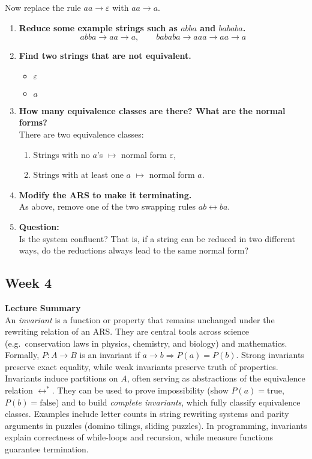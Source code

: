 \documentclass{article}
\theoremstyle{plain}
\theoremstyle{definition}
\theoremstyle{remark}
\begin{document}
Now replace the rule $aa \to \varepsilon$ with $aa \to a$.

\begin{enumerate}
  \item \textbf{Reduce some example strings such as $abba$ and $bababa$.}
  \[
    abba \to aa \to a, \qquad
    bababa \to aaa \to aa \to a
  \]

  \item \textbf{Find two strings that are not equivalent.}
  \begin{itemize}
    \item $\varepsilon$
    \item $a$
  \end{itemize}

  \item \textbf{How many equivalence classes are there? What are the normal forms?} \\
  There are two equivalence classes:
  \begin{enumerate}
    \item Strings with no $a$’s $\mapsto$ normal form $\varepsilon$,
    \item Strings with at least one $a$ $\mapsto$ normal form $a$.
  \end{enumerate}

  \item \textbf{Modify the ARS to make it terminating.} \\
  As above, remove one of the two swapping rules $ab \leftrightarrow ba$.

  \item \textbf{Question:} \\
  Is the system confluent? That is, if a string can be reduced in two different ways, do the reductions always lead to the same normal form?
\end{enumerate}

\subsection{Week 4}
\textbf{Lecture Summary}
\\An \emph{invariant} is a function or property that remains unchanged under the rewriting relation of an ARS. 
They are central tools across science (e.g.\ conservation laws in physics, chemistry, and biology) and mathematics. 
Formally, $P:A\to B$ is an invariant if $a\to b \Rightarrow P(a)=P(b)$. 
Strong invariants preserve exact equality, while weak invariants preserve truth of properties. 
Invariants induce partitions on $A$, often serving as abstractions of the equivalence relation $\leftrightarrow^\ast$. 
They can be used to prove impossibility (show $P(a)=\text{true}$, $P(b)=\text{false}$) and to build \emph{complete invariants}, which fully classify equivalence classes. 
Examples include letter counts in string rewriting systems and parity arguments in puzzles (domino tilings, sliding puzzles). 
In programming, invariants explain correctness of while-loops and recursion, while measure functions guarantee termination.
\end{document}
